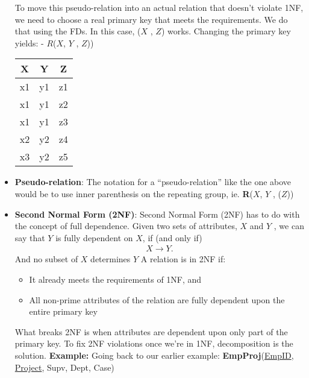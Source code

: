 \documentclass{report}
\begin{document}
\begin{itemize}
            To move this pseudo-relation into an actual relation that doesn’t violate 1NF, we need to choose a real primary key that meets the requirements. We do that using the FDs. In this case, ($X$ , $Z$) works.
            \bigbreak \noindent 
            Changing the primary key yields: - $R$($X$, $Y$ , $Z$))
            \bigbreak \noindent 
            \begin{center}
                \begin{tabular}{c|c|c}
                    X  & Y  & Z  \\ \hline
                    x1 & y1 & z1 \\ \hline
                    x1 & y1 & z2 \\ \hline
                    x1 & y1 & z3 \\ \hline
                    x2 & y2 & z4 \\ \hline
                    x3 &y2 & z5 
                \end{tabular}
            \end{center}
        \item \textbf{Pseudo-relation}: The notation for a “pseudo-relation” like the one above would be to use inner parenthesis on the repeating group, ie. \textbf{R}($X$, $Y$ , ($Z$))
        \item \textbf{Second Normal Form (2NF)}: Second Normal Form (2NF) has to do with the concept of full dependence.
            \bigbreak \noindent 
            Given two sets of attributes, $X$ and $Y$ , we can say that $Y$  is fully dependent on $X$, if (and only if)
            \begin{align*}
                X \to Y
            .\end{align*}
            And no subset of $X$ determines $Y$
            \bigbreak \noindent 
            A relation is in 2NF if:
            \begin{itemize}
                \item It already meets the requirements of 1NF, and
                \item All non-prime attributes of the relation are fully dependent upon the entire primary key
            \end{itemize}
            \bigbreak \noindent 
            What breaks 2NF is when attributes are dependent upon only part of the primary key. To fix 2NF violations once we’re in 1NF, decomposition is the solution.
            \bigbreak \noindent 
            \textbf{Example:} Going back to our earlier example: \textbf{EmpProj}(\underline{EmpID}, \underline{Project}, Supv, Dept, Case)

\end{itemize}
\end{document}
